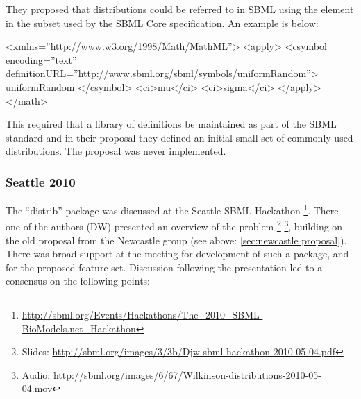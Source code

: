 \documentclass[draftspec]{sbmlpkgspec}
\begin{document}
They proposed that distributions could be referred to in SBML using
the  element in the \mathml subset used by
the SBML Core specification. An example is below:

\begin{example}
<xmlns=''http://www.w3.org/1998/Math/MathML''>
  <apply>
    <csymbol encoding=''text''
        definitionURL=''http://www.sbml.org/sbml/symbols/uniformRandom''>
      uniformRandom
    </csymbol>
    <ci>mu</ci>
    <ci>sigma</ci>
  </apply>
</math>
\end{example}

This required that a library of definitions be maintained as part of
the SBML standard and in their proposal they defined an initial small
set of commonly used distributions. The proposal was never
implemented.

\subsubsection{Seattle 2010}

The ``distrib'' package was discussed at the Seattle SBML Hackathon%
\footnote{\url{http://sbml.org/Events/Hackathons/The_2010_SBML-BioModels.net_Hackathon}}. There
one of the authors (DW) presented an overview of the problem%
\footnote{Slides:
 \url{http://sbml.org/images/3/3b/Djw-sbml-hackathon-2010-05-04.pdf}}%
\footnote{Audio:
  \url{http://sbml.org/images/6/67/Wilkinson-distributions-2010-05-04.mov}},
building on the old proposal from the Newcastle group
 (see above: \ref{sec:newcastle proposal}).
There was broad support at the meeting for development of such a
package, and for the proposed feature set. Discussion following the
presentation led to a consensus on the following points:
\end{document}

